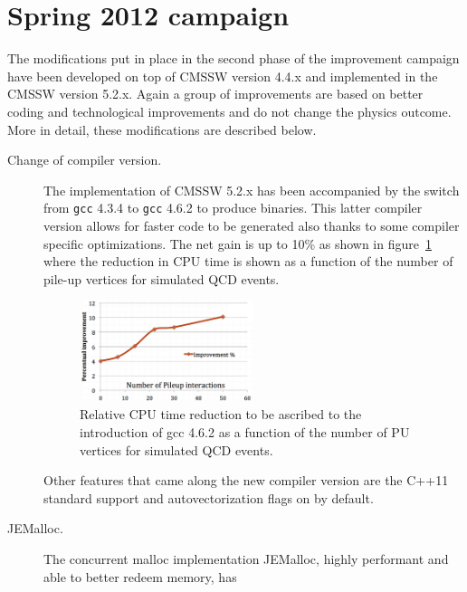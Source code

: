 \section{Spring 2012 campaign}
\label{spring12}

The modifications put in place in the second phase of the
improvement campaign have been developed on top of CMSSW version 4.4.x
and implemented in the CMSSW version 5.2.x. Again a group of
improvements are based on better coding and technological
improvements and do not change the physics outcome. More in detail,
these modifications are described below.

\begin{description}
\item[Change of compiler version.] The implementation of CMSSW
  5.2.x has been accompanied by the switch from \verb-gcc- 4.3.4
  to \verb-gcc- 4.6.2 to produce binaries. This latter compiler
  version allows for faster code to be generated also thanks to some
  compiler specific optimizations. The net gain is up
  to 10\% as shown in figure~\ref{fig:gcc} where the reduction in CPU
  time is shown as a function of the number of pile-up vertices for
  simulated QCD events.
\begin{figure}[b]
\includegraphics*[width=0.5\textwidth]{figs/gcc.png}\hspace{0.02\textwidth}%
\begin{minipage}[b]{0.38\textwidth}\caption{\label{fig:gcc}Relative
    CPU time reduction to be ascribed to the introduction of
    gcc 4.6.2 as a function of the number of PU vertices for
    simulated QCD events.} 
\end{minipage}
\end{figure}
  Other features that came along the new compiler version are the
  C++11 standard support and autovectorization flags on by default.
\item[JEMalloc.] The concurrent malloc implementation
  JEMalloc, highly performant and able to better redeem memory, has

\end{description}
